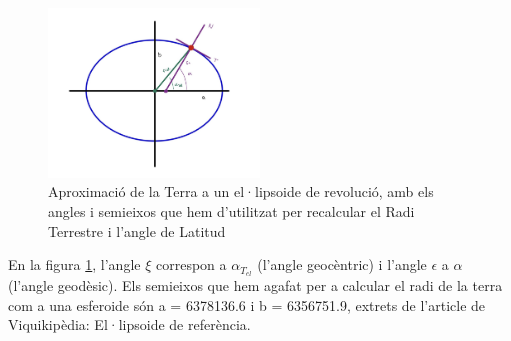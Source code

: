 \documentclass[11pt]{article}
\begin{document}
\begin{figure}[H]
    \centering
    \includegraphics[width=0.5\textwidth]{Terraelipsoide.jpg}
    \caption{Aproximació de la Terra a un el·lipsoide de revolució, amb els angles i semieixos que hem d'utilitzat per recalcular el Radi Terrestre i l'angle de Latitud}
    \label{fig:terraelipsoide}
\end{figure}

En la figura \ref{fig:terraelipsoide}, l'angle $\xi$ correspon a $\alpha_{T_{el}}$ (l'angle geocèntric) i l'angle $\epsilon$ a $\alpha$ (l'angle geodèsic). Els semieixos que hem agafat per a calcular el radi de la terra com a una esferoide són a = 6378136.6 i b = 6356751.9, extrets de l'article de Viquikipèdia: El·lipsoide de referència.

\end{document}
